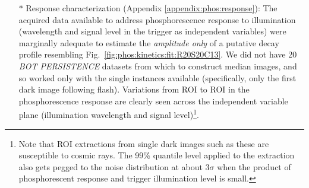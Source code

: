\begin{itemize}
    \item[$\ast$] Response characterization (Appendix \ref{appendix:phos:response}): The acquired data available to address phosphorescence response to illumination (wavelength and signal level in the trigger as independent variables) were marginally adequate to estimate the {\it amplitude only} of a putative decay profile resembling Fig.~\ref{fig:phos:kinetics:fit:R20S20C13}. We did not have 20 {\it BOT PERSISTENCE} datasets from which to construct median images, and so worked only with the single instances available (specifically, only the first dark image following flash). Variations from ROI to ROI in the phosphorescence response are clearly seen across the independent variable plane (illumination wavelength and signal level)\footnote{Note that ROI extractions from single dark images such as these are susceptible to cosmic rays. The 99\% quantile level applied to the extraction also gets pegged to the noise distribution at about $3\sigma$ when the product of phosphorescent response and trigger illumination level is small.}.
\end{itemize}


\clearpage

\clearpage

\clearpage

\clearpage

\clearpage
